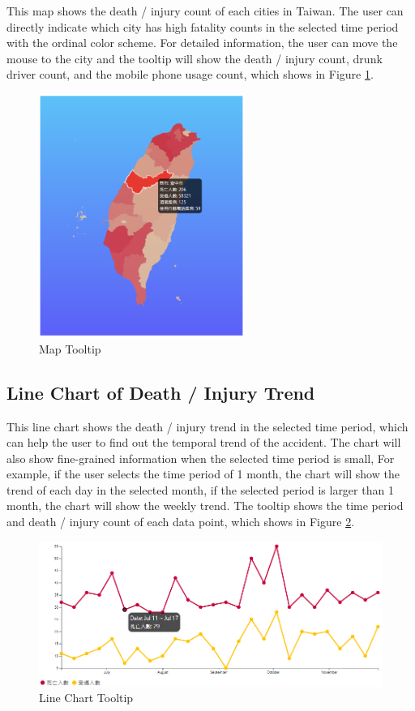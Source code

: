 \documentclass[a4paper, oneside, final, 12pt]{scrartcl} %
\begin{document}
This map shows the death / injury count of each cities in Taiwan.
The user can directly indicate which city has high fatality counts 
in the selected time period with the ordinal color scheme.
For detailed information, the user can move the mouse to the city
and the tooltip will show the death / injury count,
drunk driver count, and the mobile phone usage count,
which shows in Figure \ref{fig: map_tooltip}.

\begin{figure}[htbp]
  \centering
  \includegraphics[width=0.6\textwidth]{"./Image/map_tooltip.png"}
  \caption{Map Tooltip}
  \label{fig: map_tooltip}
\end{figure}

\subsection{Line Chart of Death / Injury Trend}

This line chart shows the death / injury trend in the selected time period,
which can help the user to find out the temporal trend of the accident.
The chart will also show fine-grained information when the selected time period is small,
For example, if the user selects the time period of 1 month,
the chart will show the trend of each day in the selected month,
if the selected period is larger than 1 month,
the chart will show the weekly trend.
The tooltip shows the time period and death / injury count of each data point,
which shows in Figure \ref{fig: line_tooltip}.

\begin{figure}[htbp]
  \centering
  \includegraphics[width=1.0\textwidth]{"./Image/line_tooltip.png"}
  \caption{Line Chart Tooltip}
  \label{fig: line_tooltip}
\end{figure}
\end{document}
